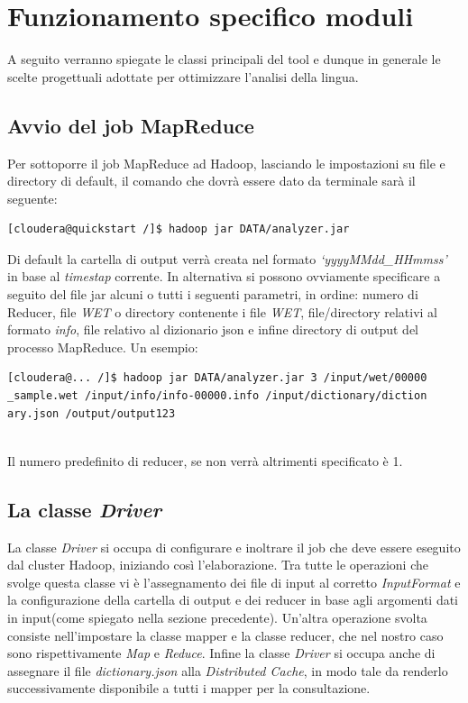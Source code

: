 \documentclass{article}
\newcommand{\MR}{MapReduce}
\newcommand{\WET}{\textit{WET}}
\newcommand{\info}{\textit{info}}
\newcommand{\DC}{\textit{Distributed Cache}}
\newcommand{\filename}[1]{\textit{#1}}
\newcommand{\class}[1]{\textit{#1}}
\begin{document}
\newpage
\section{Funzionamento specifico moduli}

A seguito verranno spiegate le classi principali del tool e dunque in generale le scelte progettuali adottate per ottimizzare l'analisi della lingua.

\subsection{Avvio del job \MR{}}
Per sottoporre il job \MR{} ad Hadoop, lasciando le impostazioni su file e directory di default, il comando che dovrà essere dato da terminale sarà il seguente:
\begin{verbatim}
[cloudera@quickstart /]$ hadoop jar DATA/analyzer.jar

\end{verbatim}
Di default la cartella di output verrà creata nel formato \textit{`yyyyMMdd\_HHmmss'} in base al \textit{timestap} corrente.
In alternativa si possono ovviamente specificare a seguito del file jar alcuni o tutti i seguenti parametri, in ordine: numero di Reducer, file \WET{} o directory contenente i file \WET{}, file/directory relativi al formato \info{}, file relativo al dizionario json e infine directory di output del processo \MR{}. Un esempio:
\begin{verbatim}
[cloudera@... /]$ hadoop jar DATA/analyzer.jar 3 /input/wet/00000
_sample.wet /input/info/info-00000.info /input/dictionary/diction
ary.json /output/output123
                                
\end{verbatim}
Il numero predefinito di reducer, se non verrà altrimenti specificato è 1.

\subsection{La classe \textit{Driver}}
La classe \class{Driver} si occupa di configurare e inoltrare il job che deve essere eseguito dal cluster Hadoop, iniziando così l'elaborazione. Tra tutte le operazioni che svolge questa classe vi è l'assegnamento dei file di input al corretto \textit{InputFormat} e la configurazione della cartella di output e dei reducer in base agli argomenti dati in input(come spiegato nella sezione precedente). Un'altra operazione svolta consiste nell'impostare la classe mapper e la classe reducer, che nel nostro caso sono rispettivamente \filename{Map} e \filename{Reduce}. Infine la classe \filename{Driver} si occupa anche di assegnare il file \filename{dictionary.json} alla \DC{}, in modo tale da renderlo successivamente disponibile a tutti i mapper per la consultazione.
\end{document}
